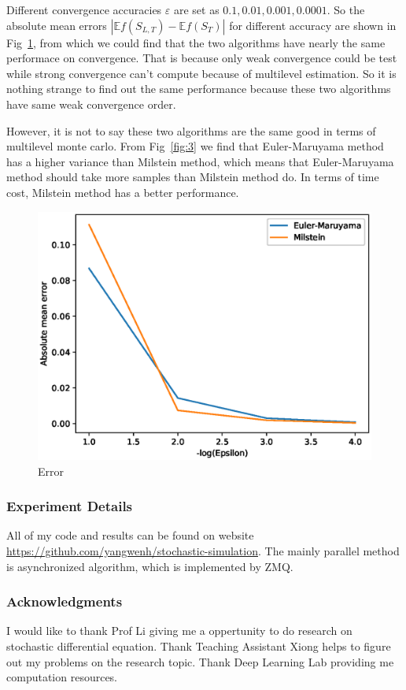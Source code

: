 \documentclass{article} %
\begin{document}
Different convergence accuracies $\varepsilon$ are set as $0.1,0.01,0.001,0.0001$. So the absolute mean errors $|\mathbb{E}f(S_{L, T}) - \mathbb{E}f(S_{T})|$ for different accuracy are shown in Fig~\ref{fig:4}, from which we could find that the two algorithms have nearly the same performace on convergence. That is because only weak convergence could be test while strong convergence can't compute because of multilevel estimation. So it is nothing strange to find out the same performance because these two algorithms have same weak convergence order.

However, it is not to say these two algorithms are the same good in terms of multilevel monte carlo. From Fig~\ref{fig:3} we find that Euler-Maruyama method has a higher variance than Milstein method, which means that Euler-Maruyama method should take more samples than Milstein method do. In terms of time cost, Milstein method has a better performance.
\begin{figure}[htbp!]
  \centering
  \includegraphics[width=\textwidth]{mmc-err.eps}
  \caption{Error}
  \label{fig:4}
\end{figure}

\subsubsection*{Experiment Details}
All of my code and results can be found on website \url{https://github.com/yangwenh/stochastic-simulation}. The mainly parallel method is asynchronized algorithm, which is implemented by ZMQ.

\subsubsection*{Acknowledgments}

I would like to thank Prof Li giving me a oppertunity to do research on stochastic differential equation. Thank Teaching Assistant Xiong helps to figure out my problems on the research topic. Thank Deep Learning Lab providing me computation resources.



\end{document}

